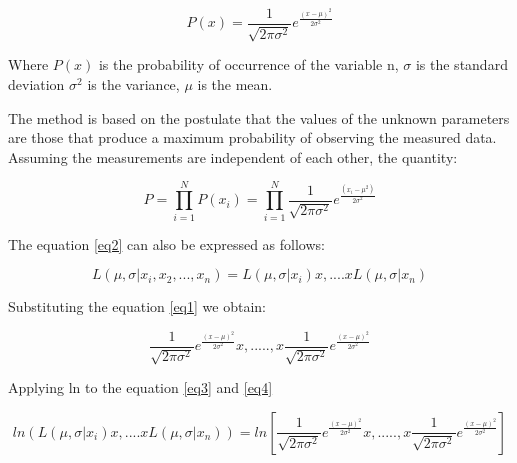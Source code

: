 \documentclass[letterpaper,12pt,openright,oneside]{article}
\begin{document}
\begin{equation}\label{eq1}
P(x) = \frac{1}{\sqrt{2 \pi \sigma ^2}} e^{\frac{(x-\mu)^2}{2\sigma^2}}
\end{equation}

Where $P(x)$ is the probability of occurrence of the variable n, $\sigma$ is the standard deviation $\sigma^2$ is the variance, $\mu$ is the mean.



The method is based on the postulate that the values of the unknown parameters are those that produce a maximum probability of observing the measured data. Assuming the measurements are independent of each other, the quantity:

  
  
\begin{equation}\label{eq2}
P =  \prod_{i=1}^N P(x_{i}) = \prod_{i=1}^N \frac{1}{\sqrt{2\pi\sigma^2}} e^{\frac{(x_{i}-\mu^2)}{2\sigma^2}} 
\end{equation}
  
 
The equation \ref{eq2} can also be expressed as follows: 
 
 
\begin{equation}\label{eq3}
L(\mu, \sigma| x_{i},x_{2},...,x_{n}) = L(\mu, \sigma|x_{i})x,....x L(\mu, \sigma|x_{n})
\end{equation}
    
Substituting the equation \ref{eq1} we obtain:
     
\begin{equation}\label{eq4}
\frac{1}{\sqrt{2 \pi \sigma ^2}} e^{\frac{(x-\mu)^2}{2\sigma^2}} x ,....., x  \frac{1}{\sqrt{2 \pi \sigma ^2}} e^{\frac{(x-\mu)^2}{2\sigma^2}}
\end{equation}

Applying ln to the equation \ref{eq3} and \ref{eq4}

\begin{equation}\label{eq5}
 ln(L(\mu, \sigma|x_{i})x,....x L(\mu, \sigma|x_{n})) = ln[\frac{1}{\sqrt{2 \pi \sigma ^2}} e^{\frac{(x-\mu)^2}{2\sigma^2}} x ,....., x  \frac{1}{\sqrt{2 \pi \sigma ^2}} e^{\frac{(x-\mu)^2}{2\sigma^2}}]
\end{equation} 
\end{document}
